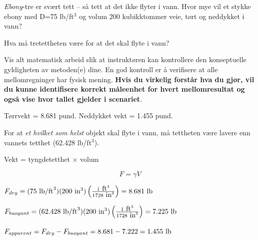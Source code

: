 

\textit{Ebony}-tre er svært tett -- så tett at det ikke flyter i vann.  Hvor mye vil et stykke ebony med D=75 lb/ft$^{3}$ og volum 200 kubikktommer veie, tørt og neddykket i vann?

\vskip 10pt

Hva må tretettheten være for at det skal flyte i vann?

\vskip 10pt

Vis alt matematisk arbeid slik at instruktøren kan kontrollere den konseptuelle gyldigheten av metoden(e) dine.  En god kontroll er å verifisere at alle mellomregninger har fysisk mening.  {\bf Hvis du virkelig forstår hva du gjør, vil du kunne identifisere korrekt måleenhet for hvert mellomresultat og også vise hvor tallet gjelder i scenariet}.

\vskip 10pt







Tørrvekt = 8.681 pund.  Neddykket vekt = 1.455 pund.

\vskip 10pt

For at \textit{et hvilket som helst} objekt skal flyte i vann, må tettheten være lavere enn vannets tetthet (62.428 lb/ft$^{3}$).







Vekt = tyngdetetthet $\times$ volum

\vskip 10pt

$$F = \gamma V$$

\vskip 10pt

$F_{dry} = (75 \hbox{ lb/ft}^3) (200 \hbox{ in}^3) \left(1 \hbox{ ft}^3 \over 1728 \hbox{ in}^3\right) = 8.681 \hbox{ lb}$

\vskip 10pt

$F_{buoyant} = (62.428 \hbox{ lb/ft}^3) (200 \hbox{ in}^3) \left(1 \hbox{ ft}^3 \over 1728 \hbox{ in}^3\right) = 7.225 \hbox{ lb}$

\vskip 10pt

$F_{apparent} = F_{dry} - F_{buoyant} = 8.681 - 7.222 = 1.455 \hbox{ lb}$


